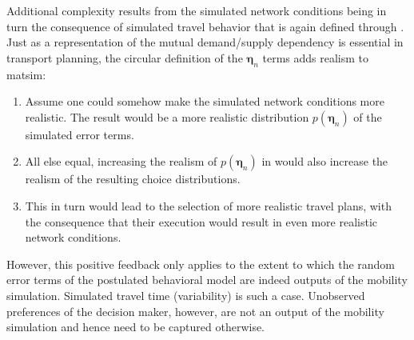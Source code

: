 Additional complexity results from the simulated network conditions
being in turn the consequence of simulated travel behavior that is
again defined through . 
Just as a representation
of the mutual demand/supply dependency is essential in transport planning,
the circular definition of the $\boldsymbol{\eta}_n$ terms adds realism to \gls{matsim}:
\begin{enumerate}
\item Assume one could somehow make the simulated network conditions more
realistic. The result would be a more realistic distribution $p(\boldsymbol{\eta}_n)$
of the simulated error terms.
\item All else equal, increasing the realism of $p(\boldsymbol{\eta}_n)$ in 
would also increase the realism of the resulting choice distributions.
\item This in turn would lead to the selection of more realistic travel
plans, with the consequence that their execution would result in even
more realistic network conditions.
\end{enumerate}
However, this positive feedback only applies to the extent to which
the random error terms of the postulated behavioral model are indeed
outputs of the mobility simulation. Simulated travel time (variability)
is such a case. Unobserved preferences of the decision maker, however,
are not an output of the mobility simulation and hence need to be
captured otherwise. 

%


